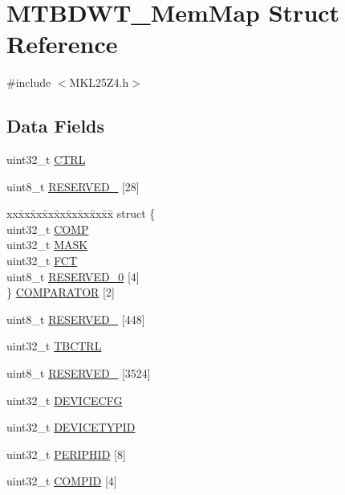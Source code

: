 \hypertarget{struct_m_t_b_d_w_t___mem_map}{}\section{M\+T\+B\+D\+W\+T\+\_\+\+Mem\+Map Struct Reference}
\label{struct_m_t_b_d_w_t___mem_map}


{\ttfamily \#include $<$M\+K\+L25\+Z4.\+h$>$}

\subsection*{Data Fields}
\begin{DoxyCompactItemize}
\item 
uint32\+\_\+t \hyperlink{struct_m_t_b_d_w_t___mem_map_a3be6514ca3bd369fd0de9f8f49471179}{C\+T\+RL}
\item 
uint8\+\_\+t \hyperlink{struct_m_t_b_d_w_t___mem_map_ac8c74521f9046fb165e5340648fde167}{R\+E\+S\+E\+R\+V\+E\+D\+\_} \mbox{[}28\mbox{]}
\item 
\begin{tabbing}
xx\=xx\=xx\=xx\=xx\=xx\=xx\=xx\=xx\=\kill
struct \{\\
\>uint32\_t \hyperlink{struct_m_t_b_d_w_t___mem_map_aa1352530035b6609791c19fda0cc2fb6}{COMP}\\
\>uint32\_t \hyperlink{struct_m_t_b_d_w_t___mem_map_a33f6052ebf71e72af18f19c6edadafc4}{MASK}\\
\>uint32\_t \hyperlink{struct_m_t_b_d_w_t___mem_map_a46e8a27d0191f1241050aeb47264ff8f}{FCT}\\
\>uint8\_t \hyperlink{struct_m_t_b_d_w_t___mem_map_ac8c74521f9046fb165e5340648fde167}{RESERVED\_0} \mbox{[}4\mbox{]}\\
\} \hyperlink{struct_m_t_b_d_w_t___mem_map_a1a157de630e178a24c5ecf7db8f65bc6}{COMPARATOR} \mbox{[}2\mbox{]}\\

\end{tabbing}\item 
uint8\+\_\+t \hyperlink{struct_m_t_b_d_w_t___mem_map_a58f4945ef26d5e7445535c45a4b9a41c}{R\+E\+S\+E\+R\+V\+E\+D\+\_} \mbox{[}448\mbox{]}
\item 
uint32\+\_\+t \hyperlink{struct_m_t_b_d_w_t___mem_map_a6efc9cce972933a09ad4baee83a38ac3}{T\+B\+C\+T\+RL}
\item 
uint8\+\_\+t \hyperlink{struct_m_t_b_d_w_t___mem_map_ab94602d1d19ef947e697256be9e503ea}{R\+E\+S\+E\+R\+V\+E\+D\+\_} \mbox{[}3524\mbox{]}
\item 
uint32\+\_\+t \hyperlink{struct_m_t_b_d_w_t___mem_map_ad35a23bd184366d37228829c33d5bda6}{D\+E\+V\+I\+C\+E\+C\+FG}
\item 
uint32\+\_\+t \hyperlink{struct_m_t_b_d_w_t___mem_map_aa736d6fbfbc7e051f6a2caadd4f17b8f}{D\+E\+V\+I\+C\+E\+T\+Y\+P\+ID}
\item 
uint32\+\_\+t \hyperlink{struct_m_t_b_d_w_t___mem_map_ab6fdc70dd1345592145d79d210ee616d}{P\+E\+R\+I\+P\+H\+ID} \mbox{[}8\mbox{]}
\item 
uint32\+\_\+t \hyperlink{struct_m_t_b_d_w_t___mem_map_a51d2026476b6e1547beb909d07d4aa32}{C\+O\+M\+P\+ID} \mbox{[}4\mbox{]}
\end{DoxyCompactItemize}


